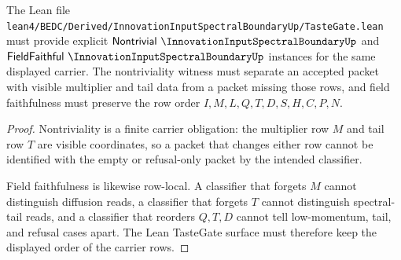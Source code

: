 \begin{theorem}
\label{thm:innovation-input-spectral-boundary-tastegate-readiness}
The Lean file \texttt{lean4/BEDC/Derived/InnovationInputSpectralBoundaryUp/TasteGate.lean} must provide explicit $\mathsf{Nontrivial}\ \InnovationInputSpectralBoundaryUp$ and $\mathsf{FieldFaithful}\ \InnovationInputSpectralBoundaryUp$ instances for the same displayed carrier. The nontriviality witness must separate an accepted packet with visible multiplier and tail data from a packet missing those rows, and field faithfulness must preserve the row order $I,M,L,Q,T,D,S,H,C,P,N$.
\end{theorem}
\begin{proof}
Nontriviality is a finite carrier obligation: the multiplier row $M$ and tail row $T$ are visible coordinates, so a packet that changes either row cannot be identified with the empty or refusal-only packet by the intended classifier.

Field faithfulness is likewise row-local. A classifier that forgets $M$ cannot distinguish diffusion reads, a classifier that forgets $T$ cannot distinguish spectral-tail reads, and a classifier that reorders $Q,T,D$ cannot tell low-momentum, tail, and refusal cases apart. The Lean TasteGate surface must therefore keep the displayed order of the carrier rows.
\end{proof}





